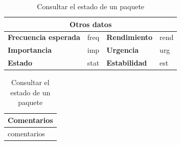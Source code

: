 \documentclass[12pt,spanish]{article}
\begin{document}
\begin{table}[H]
\vspace{1cm}

\begin{tabular}{|m{3.72cm}|m{3.72cm}|m{3.72cm}|m{3.72cm}|}
\hline
\multicolumn{4}{|c|}{\textbf{Otros datos}} \\
\hline
\textbf{Frecuencia esperada} & freq & \textbf{Rendimiento} & rend \\
\hline
\textbf{Importancia} & imp & \textbf{Urgencia} & urg \\
\hline
\textbf{Estado} & stat & \textbf{Estabilidad} & est \\
\hline
\end{tabular}

\vspace{1cm}

\begin{tabular}{|m{16.2cm}|}
\hline
\textbf{Comentarios} \\
\hline
comentarios \\
\hline
\end{tabular}

\caption{Consultar el estado de un paquete}

\end{table}
 

\end{document}
